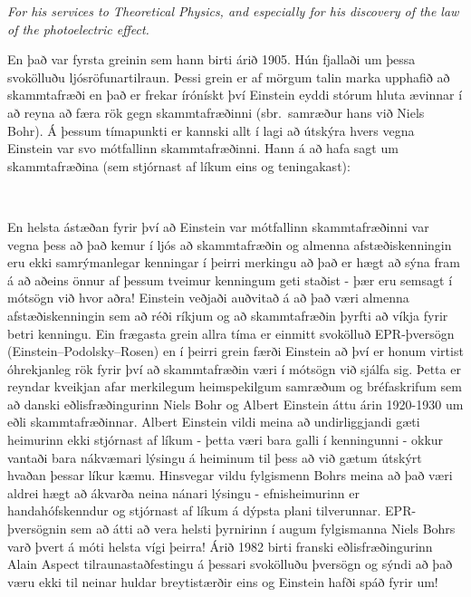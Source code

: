\vspace{0.1cm}
 \textit{For his services to Theoretical Physics, and especially for his discovery of the law of the photoelectric effect.}
 \vspace{0.3cm}
 
 En það var fyrsta greinin sem hann birti árið 1905. Hún fjallaði um þessa svokölluðu ljósröfunartilraun. Þessi grein er af mörgum talin marka upphafið að skammtafræði en það er frekar írónískt því Einstein eyddi stórum hluta ævinnar í að reyna að færa rök gegn skammtafræðinni (sbr.~samræður hans við Niels Bohr). Á þessum tímapunkti er kannski allt í lagi að útskýra hvers vegna Einstein var svo mótfallinn skammtafræðinni. Hann á að hafa sagt um skammtafræðina (sem stjórnast af líkum eins og teningakast):
 
\begin{tcolorbox}
 \\

\vspace{-0.5cm}
\end{tcolorbox}

En helsta ástæðan fyrir því að Einstein var mótfallinn skammtafræðinni var vegna þess að það kemur í ljós að skammtafræðin og almenna afstæðiskenningin eru ekki samrýmanlegar kenningar í þeirri merkingu að það er hægt að sýna fram á að aðeins önnur af þessum tveimur kenningum geti staðist - þær eru semsagt í mótsögn við hvor aðra! Einstein veðjaði auðvitað á að það væri almenna afstæðiskenningin sem að réði ríkjum og að skammtafræðin þyrfti að víkja fyrir betri kenningu. Ein frægasta grein allra tíma er einmitt svokölluð EPR-þversögn (Einstein–Podolsky–Rosen) en í þeirri grein færði Einstein að því er honum virtist óhrekjanleg rök fyrir því að skammtafræðin væri í mótsögn við sjálfa sig. Þetta er reyndar kveikjan afar merkilegum heimspekilgum samræðum og bréfaskrifum sem að danski eðlisfræðingurinn Niels Bohr og Albert Einstein áttu árin 1920-1930 um eðli skammtafræðinnar. Albert Einstein vildi meina að undirliggjandi gæti heimurinn ekki stjórnast af líkum - þetta væri bara galli í kenningunni - okkur vantaði bara nákvæmari lýsingu á heiminum til þess að við gætum útskýrt hvaðan þessar líkur kæmu. Hinsvegar vildu fylgismenn Bohrs meina að það væri aldrei hægt að ákvarða neina nánari lýsingu - efnisheimurinn er handahófskenndur og stjórnast af líkum á dýpsta plani tilverunnar. EPR-þversögnin sem að átti að vera helsti þyrnirinn í augum fylgismanna Niels Bohrs varð þvert á móti helsta vígi þeirra! Árið 1982 birti franski eðlisfræðingurinn Alain Aspect tilraunastaðfestingu á þessari svokölluðu þversögn og sýndi að það væru ekki til neinar huldar breytistærðir eins og Einstein hafði spáð fyrir um!


